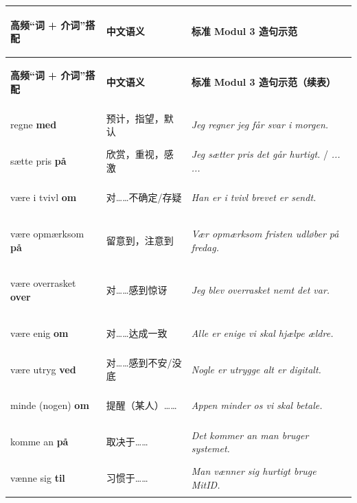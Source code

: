\vspace{0.25em}
\renewcommand{\arraystretch}{1.24}
{\small
\begin{xltabular}{\linewidth}{@{} >{\bfseries\color{NCDNavy}\raggedright\arraybackslash}p{3.8cm} >{\raggedright\arraybackslash}p{3.9cm} >{\raggedright\arraybackslash}X @{}}
\toprule
\textbf{高频“词 + 介词”搭配} & \textbf{中文语义} & \textbf{标准 Modul 3 造句示范} \\
\midrule
\endfirsthead
\toprule
\textbf{高频“词 + 介词”搭配} & \textbf{中文语义} & \textbf{标准 Modul 3 造句示范（续表）} \\
\midrule
\endhead
\bottomrule
\endfoot
regne \textbf{med} & 预计，指望，默认 & \textit{Jeg regner  jeg får svar i morgen.} \\
sætte pris \textbf{på} & 欣赏，重视，感激 & \textit{Jeg sætter pris  det går hurtigt.} / \textit{... ...} \\
være i tvivl \textbf{om} & 对……不确定/存疑 & \textit{Han er i tvivl  brevet er sendt.} \\
være opmærksom \textbf{på} & 留意到，注意到 & \textit{Vær opmærksom  fristen udløber på fredag.} \\
være overrasket \textbf{over} & 对……感到惊讶 & \textit{Jeg blev overrasket  nemt det var.} \\
være enig \textbf{om} & 对……达成一致 & \textit{Alle er enige  vi skal hjælpe ældre.} \\
være utryg \textbf{ved} & 对……感到不安/没底 & \textit{Nogle er utrygge  alt er digitalt.} \\
minde (nogen) \textbf{om} & 提醒（某人）…… & \textit{Appen minder os  vi skal betale.} \\
komme an \textbf{på} & 取决于…… & \textit{Det kommer an  man bruger systemet.} \\
vænne sig \textbf{til} & 习惯于…… & \textit{Man vænner sig hurtigt  bruge MitID.} \\
\end{xltabular}
}


